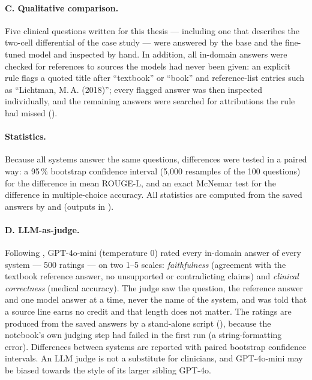 \paragraph{C. Qualitative comparison.} Five clinical questions written for this thesis --- including one that describes the two-cell differential of the case study --- were answered by the base and the fine-tuned model and inspected by hand. In addition, all in-domain answers were checked for references to sources the models had never been given: an explicit rule flags a quoted title after ``textbook'' or ``book'' and reference-list entries such as ``Lichtman, M.\,A. (2018)''; every flagged answer was then inspected individually, and the remaining answers were searched for attributions the rule had missed ().

\paragraph{Statistics.} Because all systems answer the same questions, differences were tested in a paired way: a 95\,\% bootstrap confidence interval (5{,}000 resamples of the 100 questions) for the difference in mean ROUGE-L, and an exact McNemar test for the difference in multiple-choice accuracy. All statistics are computed from the saved answers by  and  (outputs in ).

\paragraph{D. LLM-as-judge.} Following \cite{zheng2023judge}, GPT-4o-mini (temperature 0) rated every in-domain answer of every system --- 500 ratings --- on two 1--5 scales: \emph{faithfulness} (agreement with the textbook reference answer, no unsupported or contradicting claims) and \emph{clinical correctness} (medical accuracy). The judge saw the question, the reference answer and one model answer at a time, never the name of the system, and was told that a source line earns no credit and that length does not matter. The ratings are produced from the saved answers by a stand-alone script (), because the notebook's own judging step had failed in the first run (a string-formatting error). Differences between systems are reported with paired bootstrap confidence intervals. An LLM judge is not a substitute for clinicians, and GPT-4o-mini may be biased towards the style of its larger sibling GPT-4o.

